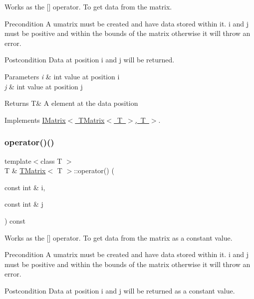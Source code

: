 Works as the \mbox{[}\mbox{]} operator. To get data from the matrix. 

\begin{DoxyPrecond}{Precondition}
A umatrix must be created and have data stored within it. i and j must be positive and within the bounds of the matrix otherwise it will throw an error. 
\end{DoxyPrecond}
\begin{DoxyPostcond}{Postcondition}
Data at position i and j will be returned.
\end{DoxyPostcond}

\begin{DoxyParams}{Parameters}
{\em i} & int value at position i \\
\hline
{\em j} & int value at position j \\
\hline
\end{DoxyParams}
\begin{DoxyReturn}{Returns}
T\& A element at the data position 
\end{DoxyReturn}


Implements \mbox{\hyperlink{class_i_matrix_a1e4246d163aaca1b224dec8839645ea9}{I\+Matrix$<$ T\+Matrix$<$ T $>$, T $>$}}.

\mbox{\label{class_t_matrix_a62d9e930e95fd666993afe0c8da1ffa2}} 
\subsubsection{\texorpdfstring{operator()()}{operator()()}\hspace{0.1cm}{\footnotesize\ttfamily [2/2]}}
{\footnotesize\ttfamily template$<$class T $>$ \\
T \& \mbox{\hyperlink{class_t_matrix}{T\+Matrix}}$<$ T $>$\+::operator() (\begin{DoxyParamCaption}\item[{const int \&}]{i,  }\item[{const int \&}]{j }\end{DoxyParamCaption}) const\hspace{0.3cm}{\ttfamily [virtual]}}



Works as the \mbox{[}\mbox{]} operator. To get data from the matrix as a constant value. 

\begin{DoxyPrecond}{Precondition}
A umatrix must be created and have data stored within it. i and j must be positive and within the bounds of the matrix otherwise it will throw an error. 
\end{DoxyPrecond}
\begin{DoxyPostcond}{Postcondition}
Data at position i and j will be returned as a constant value.
\end{DoxyPostcond}

